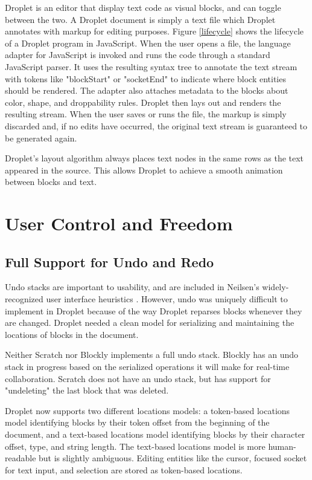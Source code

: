 \documentclass[conference]{IEEEtran}
\begin{document}
Droplet is an editor that display text code as visual blocks, and can toggle between the two. A Droplet document is simply a text file which Droplet annotates with markup for editing purposes. Figure \ref{lifecycle} shows the lifecycle of a Droplet program in JavaScript. When the user opens a file, the language adapter for JavaScript is invoked and runs the code through a standard JavaScript parser. It uses the resulting syntax tree to annotate the text stream with tokens like "blockStart" or "socketEnd" to indicate where block entities should be rendered. The adapter also attaches metadata to the blocks about color, shape, and droppability rules. Droplet then lays out and renders the resulting stream. When the user saves or runs the file, the markup is simply discarded and, if no edits have occurred, the original text stream is guaranteed to be generated again.

Droplet's layout algorithm always places text nodes in the same rows as the text appeared in the source. This allows Droplet to achieve a smooth animation between blocks and text.

\section{User Control and Freedom}

\subsection{Full Support for Undo and Redo}
Undo stacks are important to usability, and are included in Neilsen's widely-recognized user interface heuristics \cite{Neilsen}. However, undo was uniquely difficult to implement in Droplet because of the way Droplet reparses blocks whenever they are changed. Droplet needed a clean model for serializing and maintaining the locations of blocks in the document.

Neither Scratch nor Blockly implements a full undo stack. Blockly has an undo stack in progress based on the serialized operations it will make for real-time collaboration. Scratch does not have an undo stack, but has support for "undeleting" the last block that was deleted.

Droplet now supports two different locations models: a token-based locations model identifying blocks by their token offset from the beginning of the document, and a text-based locations model identifying blocks by their character offset, type, and string length. The text-based locations model is more human-readable but is slightly ambiguous. Editing entities like the cursor, focused socket for text input, and selection are stored as token-based locations.
\end{document}
